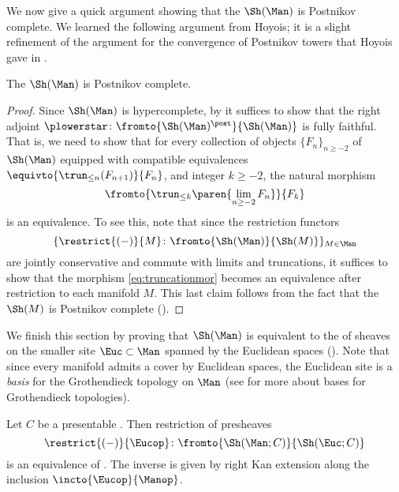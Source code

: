 We now give a quick argument showing that the \topos $ \Sh(\Man) $ is Postnikov complete.
We learned the following argument from Hoyois; it is a slight refinement of the argument for the convergence of Postnikov towers that Hoyois gave in \cite{MO:130999}.

\begin{proposition}\label{app.prop:postnikovcompleteness}
	The \topos $ \Sh(\Man) $ is Postnikov complete.
\end{proposition}

\begin{proof}
	Since $ \Sh(\Man) $ is hypercomplete, by  it suffices to show that the right adjoint $ \plowerstar \colon \fromto{\Sh(\Man)^{\post}}{\Sh(\Man)} $ is fully faithful.
	That is, we need to show that for every collection of objects $ \{F_n\}_{n \geq -2} $ of $ \Sh(\Man)$ equipped with compatible equivalences $ \equivto{\trun_{\leq n}(F_{n+1})}{F_n} $, and integer $ k \geq -2 $, the natural morphism
	\begin{equation}\label{eq:truncationmor}
		\fromto{\trun_{\leq k}\paren{\lim_{n \geq -2} F_n}}{F_k}
	\end{equation}
	is an equivalence.
	To see this, note that since the restriction functors 
	\begin{equation*}
		\{\restrict{(-)}{M} \colon \fromto{\Sh(\Man)}{\Sh(M)}\}_{M \in \Man}
	\end{equation*}
	are jointly conservative and commute with limits and truncations, it suffices to show that the morphism \eqref{eq:truncationmor} becomes an equivalence after restriction to each manifold $ M $.
	This last claim follows from the fact that the \topos $ \Sh(M) $ is Postnikov complete ().
\end{proof}

We finish this section by proving that $ \Sh(\Man) $ is equivalent to the \topos of sheaves on the smaller site $ \Euc \subset \Man $ spanned by the Euclidean spaces ().
Note that since every manifold admits a cover by Euclidean spaces, the Euclidean site is a \textit{basis} for the Grothendieck topology on $ \Man $ (see \cite[\S B.6]{Ultracategories} for more about bases for Grothendieck topologies).

\begin{corollary}\label{app.lem:hypersheavesonCart}
	Let $ C $ be a presentable \category.
	Then restriction of presheaves
	\begin{equation*}
		\restrict{(-)}{\Eucop} \colon \fromto{\Sh(\Man;C)}{\Sh(\Euc;C)}
	\end{equation*}
	is an equivalence of \categories.
	The inverse is given by right Kan extension along the inclusion $ \incto{\Eucop}{\Manop} $.
\end{corollary}

